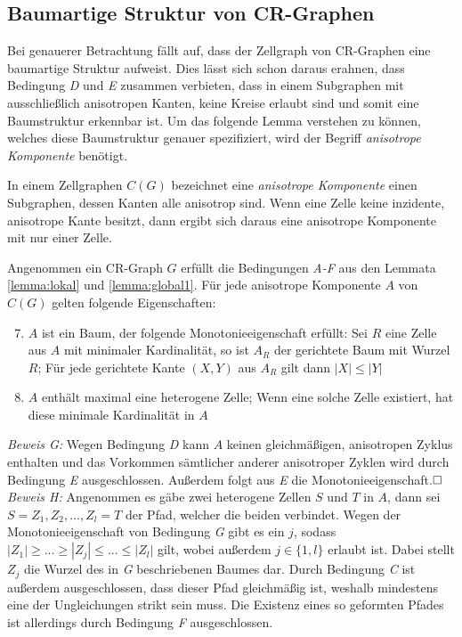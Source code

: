 \subsection{Baumartige Struktur von CR-Graphen}
Bei genauerer Betrachtung fällt auf, dass der Zellgraph von CR-Graphen eine baumartige Struktur aufweist.
Dies lässt sich schon daraus erahnen, dass Bedingung \emph{D} und \emph{E} zusammen verbieten, dass in einem Subgraphen mit ausschließlich anisotropen Kanten, keine Kreise erlaubt sind und somit eine Baumstruktur erkennbar ist.
Um das folgende Lemma verstehen zu können, welches diese Baumstruktur genauer spezifiziert, wird der Begriff \emph{anisotrope Komponente} benötigt.
\begin{Definition}
	In einem Zellgraphen $C(G)$ bezeichnet eine \emph{anisotrope Komponente} einen Subgraphen, dessen Kanten alle anisotrop sind.
	Wenn eine Zelle keine inzidente, anisotrope Kante besitzt, dann ergibt sich daraus eine anisotrope Komponente mit nur einer Zelle.
\end{Definition}

\begin{Lemma}
	Angenommen ein CR-Graph $G$ erfüllt die Bedingungen \emph{A-F} aus den Lemmata \ref{lemma:lokal} und \ref{lemma:global1}.
	Für jede anisotrope Komponente $A$ von $C(G)$ gelten folgende Eigenschaften:
	
	\begin{enumerate}[label=(\Alph*)]
		\setcounter{enumi}{6}
		\item $A$ ist ein Baum, der folgende Monotonieeigenschaft erfüllt: Sei $R$ eine Zelle aus $A$ mit minimaler Kardinalität, so ist $A_R$ der gerichtete Baum mit Wurzel $R$; Für jede gerichtete Kante $(X,Y)$ aus $A_R$ gilt dann $|X|\leq |Y|$
		\item $A$ enthält maximal eine heterogene Zelle; Wenn eine solche Zelle existiert, hat diese minimale Kardinalität in $A$
	\end{enumerate}
	\label{lemma:global2}
\end{Lemma}

\emph{Beweis G:} Wegen Bedingung \emph{D} kann $A$ keinen gleichmäßigen, anisotropen Zyklus enthalten und das Vorkommen sämtlicher anderer anisotroper Zyklen wird durch Bedingung \emph{E} ausgeschlossen. Außerdem folgt aus \emph{E} die Monotonieeigenschaft.$\hfill\square$\\

\emph{Beweis H:} Angenommen es gäbe zwei heterogene Zellen $S$ und $T$ in $A$, dann sei $S=Z_1,Z_2,...,Z_l=T$ der Pfad, welcher die beiden verbindet.
Wegen der Monotonieeigenschaft von Bedingung \emph{G} gibt es ein $j$, sodass $|Z_1|\geq ... \geq |Z_j|\leq ... \leq |Z_l|$ gilt, wobei außerdem $j\in \{1,l\}$ erlaubt ist.
Dabei stellt $Z_j$ die Wurzel des in \emph{G} beschriebenen Baumes dar.
Durch Bedingung \emph{C} ist außerdem ausgeschlossen, dass dieser Pfad gleichmäßig ist, weshalb mindestens eine der Ungleichungen strikt sein muss.
Die Existenz eines so geformten Pfades ist allerdings durch Bedingung \emph{F} ausgeschlossen.

